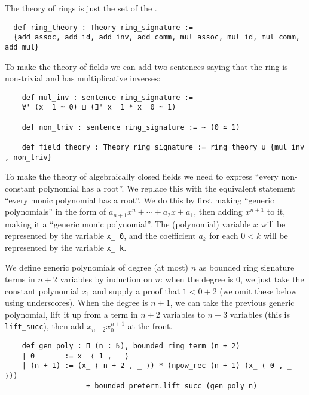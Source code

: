 \begin{dfn}

  The theory of rings is just the set of the
  .

\begin{lstlisting}
  def ring_theory : Theory ring_signature :=
  {add_assoc, add_id, add_inv, add_comm, mul_assoc, mul_id, mul_comm, add_mul}\end{lstlisting}

  To make the theory of fields we can add two sentences saying that
  the ring is non-trivial and has multiplicative inverses:
  \begin{lstlisting}
    def mul_inv : sentence ring_signature :=
    ∀' (x_ 1 ≃ 0) ⊔ (∃' x_ 1 * x_ 0 ≃ 1)

    def non_triv : sentence ring_signature := ~ (0 ≃ 1)

    def field_theory : Theory ring_signature := ring_theory ∪ {mul_inv , non_triv} \end{lstlisting}

  To make the theory of algebraically closed fields we need to express
  ``every non-constant polynomial has a root''.
  We replace this with the equivalent statement ``every monic polynomial has a root''.
  We do this by first making ``generic polynomials''
  in the form of $a_{n+1}x^{n} + \cdots + a_{2}x + a_{1}$,
  then adding $x^{n+1}$ to it, making it a ``generic monic polynomial''.
  The (polynomial) variable $x$ will be represented by the variable \texttt{x\_ 0},
  and the coefficient $a_{k}$ for each $0 < k$ will be represented by the variable
  \texttt{x\_ k}.

  We define generic polynomials of degree (at most) $n$ as bounded ring signature terms
  in $n + 2$ variables by induction on $n$:
  when the degree is $0$, we just take the constant polynomial $x_{1}$
  and supply a proof that $1 < 0 + 2$ (we omit these below using underscores).
  When the degree is $n + 1$, we can take the previous generic polynomial,
  lift it up from a term in $n + 2$ variables to $n + 3$ variables
  (this is \texttt{lift\_succ}),
  then add $x_{n + 2} x_{0}^{n+1}$ at the front.

  \begin{lstlisting}
    def gen_poly : Π (n : ℕ), bounded_ring_term (n + 2)
    | 0       := x_ ⟨ 1 , _ ⟩
    | (n + 1) := (x_ ⟨ n + 2 , _ ⟩) * (npow_rec (n + 1) (x_ ⟨ 0 , _ ⟩))
                   + bounded_preterm.lift_succ (gen_poly n)\end{lstlisting}


\end{dfn}
